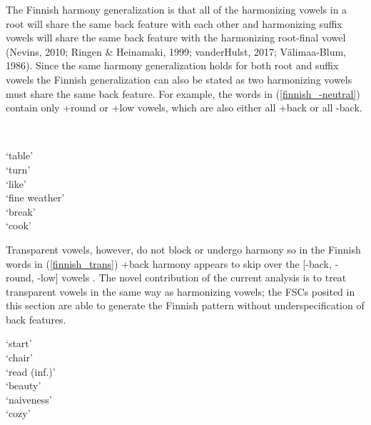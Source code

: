 \documentclass[,doc,floatsintext]{apa6}
\theoremstyle{definition}
\theoremstyle{definition}
\theoremstyle{definition}
\theoremstyle{remark}
\begin{document}
The Finnish harmony generalization is that all of the harmonizing vowels
in a root will share the same back feature with each other and
harmonizing suffix vowels will share the same back feature with the
harmonizing root-final vowel (Nevins, 2010; Ringen \& Heinamaki, 1999;
vanderHulst, 2017; Välimaa-Blum, 1986). Since the same harmony
generalization holds for both root and suffix vowels the Finnish
generalization can also be stated as two harmonizing vowels must share
the same back feature. For example, the words in
(\ref{finnish_-neutral}) contain only +round or +low vowels, which are
also either all +back or all -back.

\begin{exe}
\label{finnish_-neutral} \\
\begin{xlist}
  \ex {} `table' \\
  \ex {} `turn' \\
  \ex {} `like' \\
  \ex {} `fine weather' \\
  \ex {} `break' \\
  \ex {} `cook' \\
  \end{xlist}
\end{exe}

Transparent vowels, however, do not block or undergo harmony so in the
Finnish words in (\ref{finnish_trans}) +back harmony appears to skip
over the {[}-back, -round, -low{]} vowels \textipa{[i, i:, e, e:]}. The
novel contribution of the current analysis is to treat transparent
vowels in the same way as harmonizing vowels; the FSCs posited in this
section are able to generate the Finnish pattern without
underspecification of back features.

\begin{exe}
\label{finnish_trans}
\begin{xlist}
  \ex {} `start' \\
  \ex {} `chair' \\
  \ex {} `read (inf.)' \\
  \ex {} `beauty' \\
  \ex {} `naiveness' \\
  \ex {} `cozy' \\
  \end{xlist}
\end{exe}
\end{document}
